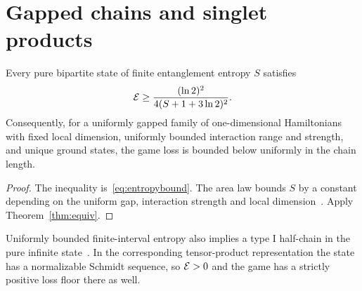 \section{Gapped chains and singlet products}\label{sec:entropy}

\begin{theorem}\label{thm:floor}
Every pure bipartite state of finite entanglement entropy $S$ satisfies
\[
\mathcal{E}\ge\frac{(\ln2)^2}{4(S+1+3\ln2)^2}.
\]
Consequently, for a uniformly gapped family of one-dimensional Hamiltonians with
fixed local dimension, uniformly bounded interaction range and strength,
and unique ground states, the game loss is bounded below
uniformly in the chain length.
\end{theorem}
\begin{proof}
The inequality is~\eqref{eq:entropybound}. The area law bounds $S$ by a
constant depending on the uniform gap, interaction strength and local
dimension~\cite{Hastings07,AKLV13}. Apply Theorem~\ref{thm:equiv}.
\end{proof}
Uniformly bounded finite-interval entropy also implies a type I half-chain in the pure infinite
state~\cite{Matsui13}. In the corresponding tensor-product representation
the state has a normalizable Schmidt sequence, so $\mathcal{E}>0$ and the game has
a strictly positive loss floor there as well.

